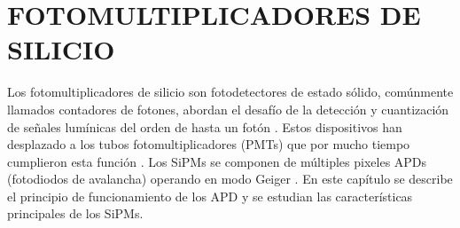 
\chapter{FOTOMULTIPLICADORES DE SILICIO}
\label{Cap:MarcoT}
Los fotomultiplicadores de silicio son fotodetectores de estado sólido, comúnmente llamados contadores de fotones, abordan el desafío de la detección y cuantización de señales lumínicas del orden de hasta un fotón \citep{Intro_SIPM_Sensl}. Estos dispositivos han desplazado a los tubos fotomultiplicadores (PMTs) que por mucho tiempo cumplieron esta función \citep{MPPC_note}. Los SiPMs se componen de múltiples pixeles APDs (fotodiodos de avalancha) operando en modo Geiger \citep{Apd_Hamamatsu}. En este capítulo se describe el principio de funcionamiento de los APD y se estudian las características principales de los SiPMs.
